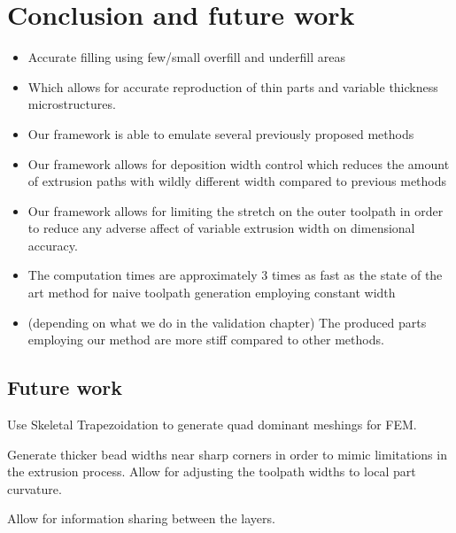 \section{Conclusion and future work}

\begin{itemize}
\item Accurate filling using few/small overfill and underfill areas
\item Which allows for accurate reproduction of thin parts and variable thickness microstructures.
\item Our framework is able to emulate several previously proposed methods
\item Our framework allows for deposition width control which reduces the amount of extrusion paths with wildly different width compared to previous methods
\item Our framework allows for limiting the stretch on the outer toolpath in order to reduce any adverse affect of variable extrusion width on dimensional accuracy.
\item The computation times are approximately 3 times as fast as the state of the art method for naive toolpath generation employing constant width
\item (depending on what we do in the validation chapter) The produced parts employing our method are more stiff compared to other methods.
\end{itemize}



\subsection{Future work}
Use Skeletal Trapezoidation to generate quad dominant meshings for FEM.

Generate thicker bead widths near sharp corners in order to mimic limitations in the extrusion process.
Allow for adjusting the toolpath widths to local part curvature.

Allow for information sharing between the layers.